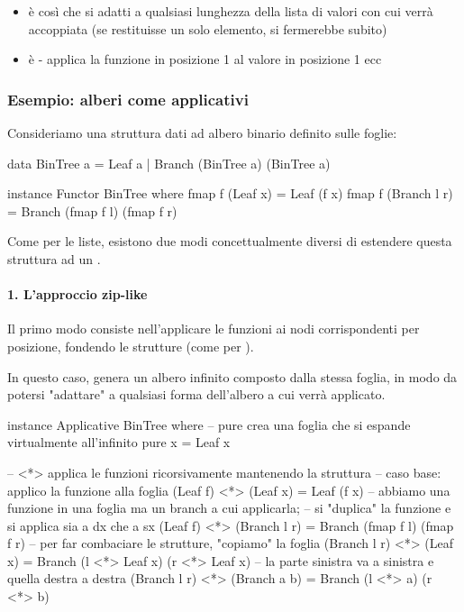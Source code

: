 \begin{itemize}
    \item {} è  così che si adatti a qualsiasi lunghezza della lista di valori con cui verrà  accoppiata (se restituisse un solo elemento,  si fermerebbe subito)
    \item \code{<*>} è  - applica la funzione in posizione 1 al valore in posizione 1 ecc
\end{itemize}

\subsubsection{Esempio: alberi come applicativi}
Consideriamo una struttura dati ad albero binario definito sulle foglie:
\begin{haskellbox}{}
data BinTree a = Leaf a | Branch (BinTree a) (BinTree a)

instance Functor BinTree where
    fmap f (Leaf x) = Leaf (f x)
    fmap f (Branch l r) = Branch (fmap f l) (fmap f r)
\end{haskellbox}

Come per le liste, esistono due modi concettualmente diversi di estendere questa struttura ad un .

\paragraph{1. L'approccio zip-like}
Il primo modo consiste nell'applicare le funzioni ai nodi corrispondenti per posizione, fondendo le strutture (come per ). 

In questo caso,  genera un albero infinito composto dalla stessa foglia, in modo da potersi "adattare" a qualsiasi forma dell'albero a cui verrà applicato.

\begin{haskellbox}{}
instance Applicative BinTree where
    -- pure crea una foglia che si espande virtualmente all'infinito
    pure x = Leaf x

    -- <*> applica le funzioni ricorsivamente mantenendo la struttura
    -- caso base: applico la funzione alla foglia
    (Leaf f) <*> (Leaf x) = Leaf (f x)
    -- abbiamo una funzione in una foglia ma un branch a cui applicarla;
    -- si "duplica" la funzione e si applica sia a dx che a sx
    (Leaf f) <*> (Branch l r) = Branch (fmap f l) (fmap f r)
    -- per far combaciare le strutture, "copiamo" la foglia
    (Branch l r) <*> (Leaf x) = Branch (l <*> Leaf x) (r <*> Leaf x)
    -- la parte sinistra va a sinistra e quella destra a destra
    (Branch l r) <*> (Branch a b) = Branch (l <*> a) (r <*> b)
\end{haskellbox}


